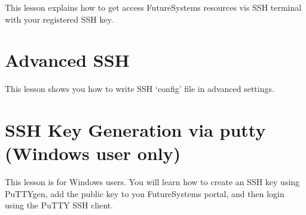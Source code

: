 This lesson explains how to get access FutureSystems resources vis SSH
terminal with your registered SSH key.


\section{Advanced SSH}

This lesson shows you how to write SSH `config' file in advanced
settings.


\section{SSH Key Generation via putty (Windows user only)}

This lesson is for Windows users. You will learn how to create an SSH
key using PuTTYgen, add the public key to you FutureSystems portal,
and then login using the PuTTY SSH client.


\begin{comment}
\section{Creating VMs using Cloudmesh and running IPython}

This lesson explains how to log into FutureSystems and our customized
shell and menu options that will simplify management of the VMs for this
upcoming lessons.

Instruction is at:
\url{http://cloudmesh.github.io/introduction_to_cloud_computing/class/cm-mooc/cm-mooc.html}

\video{Python}{19:28}{Using FS - Creating VM using Cloudmesh and running IPython}{http://youtu.be/nbZbJxheLwc}
\end{comment}